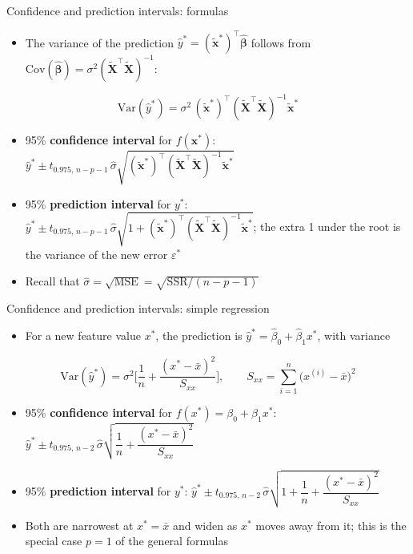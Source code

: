 \begin{frame}{Confidence and prediction intervals: formulas}
    \begin{itemize}
        \item The variance of the prediction $\hat{y}^\ast = (\tilde{\mathbf{x}}^\ast)^\top \hat{\symbf{\beta}}$ follows from $\mathrm{Cov}(\hat{\symbf{\beta}}) = \sigma^2 (\tilde{\mathbf{X}}^\top \tilde{\mathbf{X}})^{-1}$:
    \end{itemize}
    \[
        \mathrm{Var}(\hat{y}^\ast) = \sigma^2\, (\tilde{\mathbf{x}}^\ast)^\top (\tilde{\mathbf{X}}^\top \tilde{\mathbf{X}})^{-1} \tilde{\mathbf{x}}^\ast
    \]
    \begin{itemize}
        \item 95\% \textbf{confidence interval} for $f(\mathbf{x}^\ast)$: $\hat{y}^\ast \pm t_{0.975,\, n-p-1}\, \hat\sigma \sqrt{(\tilde{\mathbf{x}}^\ast)^\top (\tilde{\mathbf{X}}^\top \tilde{\mathbf{X}})^{-1} \tilde{\mathbf{x}}^\ast}$
        \item 95\% \textbf{prediction interval} for $y^\ast$: $\hat{y}^\ast \pm t_{0.975,\, n-p-1}\, \hat\sigma \sqrt{1 + (\tilde{\mathbf{x}}^\ast)^\top (\tilde{\mathbf{X}}^\top \tilde{\mathbf{X}})^{-1} \tilde{\mathbf{x}}^\ast}$; the extra 1 under the root is the variance of the new error $\varepsilon^\ast$
        \item Recall that \(\hat\sigma = \sqrt{\mathrm{MSE}} = \sqrt{\mathrm{SSR}/(n-p-1)}\)
    \end{itemize}
\end{frame}


\begin{frame}{Confidence and prediction intervals: simple regression}
    \begin{itemize}
        \item For a new feature value $x^\ast$, the prediction is $\hat{y}^\ast = \hat\beta_0 + \hat\beta_1 x^\ast$, with variance
    \end{itemize}
    \[
        \mathrm{Var}(\hat{y}^\ast) = \sigma^2 \bigg[\frac{1}{n} + \frac{(x^\ast - \bar{x})^2}{S_{xx}}\bigg], \qquad S_{xx} = \sum_{i=1}^{n} \big(x^{(i)} - \bar{x}\big)^2
    \]
    \begin{itemize}
        \item 95\% \textbf{confidence interval} for $f(x^\ast) = \beta_0 + \beta_1 x^\ast$: $\hat{y}^\ast \pm t_{0.975,\, n-2}\, \hat\sigma \sqrt{\dfrac{1}{n} + \dfrac{(x^\ast - \bar{x})^2}{S_{xx}}}$
        \item 95\% \textbf{prediction interval} for $y^\ast$: $\hat{y}^\ast \pm t_{0.975,\, n-2}\, \hat\sigma \sqrt{1 + \dfrac{1}{n} + \dfrac{(x^\ast - \bar{x})^2}{S_{xx}}}$
        \item Both are narrowest at $x^\ast = \bar{x}$ and widen as $x^\ast$ moves away from it; this is the special case $p = 1$ of the general formulas
    \end{itemize}
\end{frame}


